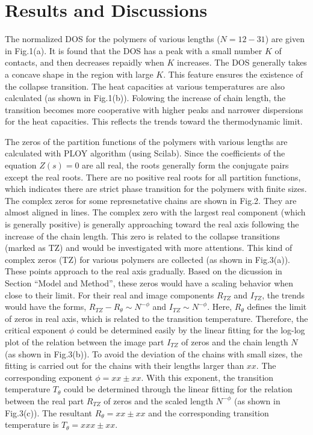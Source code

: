 \documentclass[preprint,preprintnumbers,amsmath,amssymb,showpacs,aps,pre]{revtex4-1}
\begin{document}
\section{Results and Discussions}

The normalized DOS for the polymers of various lengths ($N=12-31$) are given
in Fig.1(a). It is found that the DOS has a peak with a small number $K$ of
contacts, and then decreases repaidly when $K$ increases. The DOS generally
takes a concave shape in the region with large $K$. This feature ensures the
existence of the collapse transition. The heat capacities at various
temperatures are also calculated (as shown in Fig.1(b)). Folowing the increase
of chain length, the transition becomes more cooperative with higher peaks and
narrower dispersions for the heat capacities. This reflects the trends toward
the thermodynamic limit.

The zeros of the partition functions of the polymers with various lengths are
calculated with PLOY algorithm (using Scilab). Since the coefficients of the
equation $Z(s)=0$ are all real, the roots generally form the conjugate pairs
except the real roots. There are no positive real roots for all partition
functions, which indicates there are strict phase transition for the polymers
with finite sizes. The complex zeros for some represnetative chains are shown
in Fig.2. They are almost aligned in lines. The complex zero with the largest
real component (which is generally positive) is generally approaching toward
the real axis following the increase of the chain length. This zero is related
to the collapse transitions (marked as TZ) and would be investigated with more
attentions. This kind of complex zeros (TZ) for various polymers are collected
(as shown in Fig.3(a)). These points approach to the real axis gradually.
Based on the dicussion in Section ``Model and Method'', these zeros would
have a scaling behavior when close to their limit. For their real and image
components $R_{TZ}$ and $I_{TZ}$, the trends would have the forms,
$R_{TZ}-R_{\theta} \sim N^{-\phi}$ and $I_{TZ} \sim N^{-\phi}$. Here,
$R_{\theta}$ defines the limit of zeros in real axis, which is related to the
transition temperature. Therefore, the critical exponent $\phi$ could be
determined easily by the linear fitting for the log-log plot of the relation
between the image part $I_{TZ}$ of zeros and the chain length $N$ (as shown in
Fig.3(b)). To avoid the deviation of the chains with small sizes, the fitting
is carried out for the chains with their lengths larger than $xx$. The
corresponding exponent $\phi=xx \pm xx$. With this exponent, the transition
temperature $T_{\theta}$ could be determined through the linear fitting for
the relation between the real part $R_{TZ}$ of zeros and the scaled length
$N^{-\phi}$ (as shown in Fig.3(c)). The resultant $R_{\theta}=xx \pm xx$ and
the corresponding transition temperature is $T_{\theta}=xxx \pm xx$.
\end{document}
